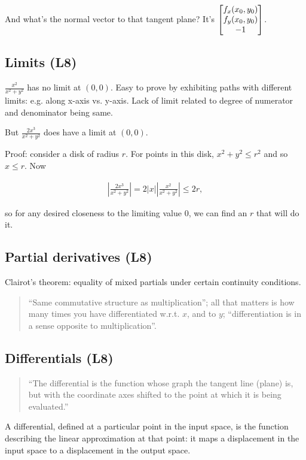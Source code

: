And what's the normal vector to that tangent plane? It's
$\begin{bmatrix}f_x(x_0, y_0)\\f_y(x_0, y_0)\\-1\end{bmatrix}$.


\subsection{Limits (L8)}

$\frac{x^2}{x^2 + y^2}$ has no limit at $(0, 0)$.
Easy to prove by exhibiting paths with different limits: e.g. along x-axis vs. y-axis.
Lack of limit related to degree of numerator and denominator being same.

But $\frac{2x^3}{x^2 + y^2}$ does have a limit at $(0, 0)$.

Proof: consider a disk of radius $r$. For points in this disk, $x^2 + y^2 \leq r^2$ and so $x \leq r$.
Now

\begin{align*}
  \left|\frac{2x^3}{x^2 + y^2}\right| = 2|x|\left|\frac{x^2}{x^2 + y^2}\right| \leq 2r,
\end{align*}

so for any desired closeness to the limiting value 0, we can find an $r$ that will do it.

\subsection{Partial derivatives (L8)}

Clairot's theorem: equality of mixed partials under certain continuity
conditions.

\begin{quote}
  ``Same commutative structure as multiplication''; all that matters
  is how many times you have differentiated w.r.t. $x$, and to $y$;
  ``differentiation is in a sense opposite to multiplication''.
\end{quote}

\subsection{Differentials (L8)}

\begin{quote}
  ``The differential is the function whose graph the tangent line (plane) is,
  but with the coordinate axes shifted to the point at which it is being
  evaluated.''
\end{quote}

A differential, defined at a particular point in the input space, is the
function describing the linear approximation at that point: it maps a
displacement in the input space to a displacement in the output space.

